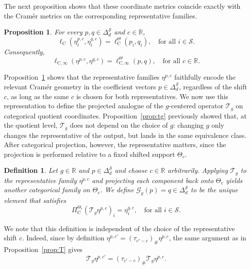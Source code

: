 \documentclass{article}
\newtheorem{proposition}[theorem]{Proposition}
\newtheorem{definition}[theorem]{Definition}
\newcommand{\X}{\mathcal{S}}
\newcommand{\R}{\mathbb{R}}
\begin{document}
The next proposition shows that these coordinate metrics coincide exactly with the Cram\'er metrics on the corresponding representative families.
\begin{proposition}\label{prop:cramer}
For every $p, q \in \Delta^\X_d$ and $c \in \R$,
\begin{equation}
\ell_{\mathrm C}(\eta^{p, c}_i, \eta^{q, c}_i) = \ell^\Theta_{\mathrm C}(p_i, q_i),\quad\text{for all } i \in \X.
\end{equation}
Consequently,
\begin{equation}
\ell_{\mathrm C, \infty}(\eta^{p, c}, \eta^{q, c}) = \ell^\Theta_{\mathrm C, \infty}(p, q),\quad\text{for all } c \in \R.
\end{equation}
\end{proposition}

Proposition~\ref{prop:cramer} shows that the representative families $\eta^{p, c}$ faithfully encode the relevant Cram\'er geometry in the coefficient vectors $p \in \Delta^\X_d$, regardless of the shift $c$, as long as the same $c$ is chosen for both representatives. We now use this representation to define the projected analogue of the $g$-centered operator $\mathcal T_g$ on categorical quotient coordinates. Proposition~\ref{prop:tg} previously showed that, at the quotient level, $\mathcal T_g$ does not depend on the choice of $g$: changing $g$ only changes the representative of the output, but lands in the same equivalence class. After categorical projection, however, the representative matters, since the projection is performed relative to a fixed shifted support $\Theta_c$.

\begin{definition}
\label{defn:proj-operator}
Let $g \in \R$ and $p \in \Delta^\X_d$ and choose $c \in \R$ arbitrarily. Applying $\mathcal T_g$ to the representative family $\eta^{p, c}$ and projecting each component back onto $\Theta_c$ yields another categorical family on $\Theta_c$. We define $\mathcal G_g(p) = q \in \Delta^\X_d$ to be the unique element that satisfies
\begin{equation}
\Pi^{\Theta_c}_{\mathrm C}(\mathcal T_g \eta^{p, c})_i = \eta^{q, c}_i,\quad \text{for all } i \in \X.
\end{equation}
\end{definition}
We note that this definition is independent of the choice of the representative shift $c$. Indeed, since by definition $\eta^{p, c'} = (\tau_{c'-c})_\#\eta^{p, c}$, the same argument as in Proposition~\ref{prop:T} gives
\begin{equation}
\mathcal T_g \eta^{p, c'} = (\tau_{c' -c})_\# \mathcal T_g \eta^{p, c}.
\end{equation}
\end{document}
